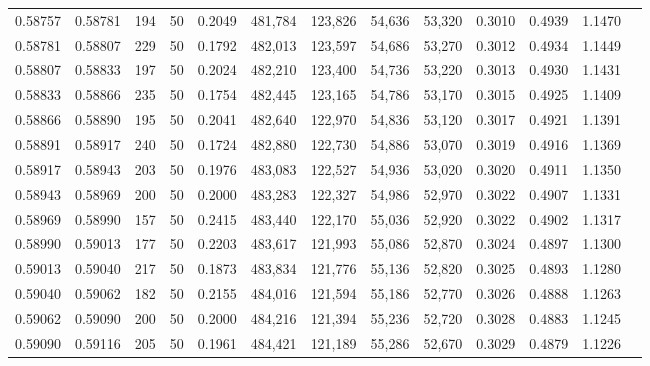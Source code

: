 \begin{tabular}{rrrrrrrrrrrrr}
0.58757 & 0.58781 &   194 &  50 &                                     0.2049 & 481,784 & 123,826 &  54,636 &  53,320 & 0.3010 & 0.4939 & 1.1470 \\
0.58781 & 0.58807 &   229 &  50 &                                     0.1792 & 482,013 & 123,597 &  54,686 &  53,270 & 0.3012 & 0.4934 & 1.1449 \\
0.58807 & 0.58833 &   197 &  50 &                                     0.2024 & 482,210 & 123,400 &  54,736 &  53,220 & 0.3013 & 0.4930 & 1.1431 \\
0.58833 & 0.58866 &   235 &  50 &                                     0.1754 & 482,445 & 123,165 &  54,786 &  53,170 & 0.3015 & 0.4925 & 1.1409 \\
0.58866 & 0.58890 &   195 &  50 &                                     0.2041 & 482,640 & 122,970 &  54,836 &  53,120 & 0.3017 & 0.4921 & 1.1391 \\
0.58891 & 0.58917 &   240 &  50 &                                     0.1724 & 482,880 & 122,730 &  54,886 &  53,070 & 0.3019 & 0.4916 & 1.1369 \\
0.58917 & 0.58943 &   203 &  50 &                                     0.1976 & 483,083 & 122,527 &  54,936 &  53,020 & 0.3020 & 0.4911 & 1.1350 \\
0.58943 & 0.58969 &   200 &  50 &                                     0.2000 & 483,283 & 122,327 &  54,986 &  52,970 & 0.3022 & 0.4907 & 1.1331 \\
0.58969 & 0.58990 &   157 &  50 &                                     0.2415 & 483,440 & 122,170 &  55,036 &  52,920 & 0.3022 & 0.4902 & 1.1317 \\
0.58990 & 0.59013 &   177 &  50 &                                     0.2203 & 483,617 & 121,993 &  55,086 &  52,870 & 0.3024 & 0.4897 & 1.1300 \\
0.59013 & 0.59040 &   217 &  50 &                                     0.1873 & 483,834 & 121,776 &  55,136 &  52,820 & 0.3025 & 0.4893 & 1.1280 \\
0.59040 & 0.59062 &   182 &  50 &                                     0.2155 & 484,016 & 121,594 &  55,186 &  52,770 & 0.3026 & 0.4888 & 1.1263 \\
0.59062 & 0.59090 &   200 &  50 &                                     0.2000 & 484,216 & 121,394 &  55,236 &  52,720 & 0.3028 & 0.4883 & 1.1245 \\
0.59090 & 0.59116 &   205 &  50 &                                     0.1961 & 484,421 & 121,189 &  55,286 &  52,670 & 0.3029 & 0.4879 & 1.1226 \\

\end{tabular}
